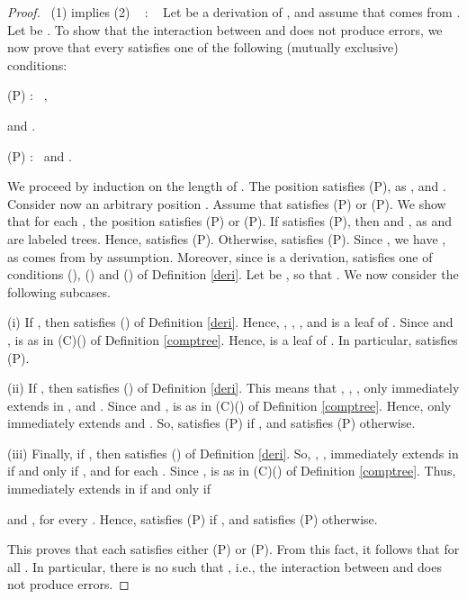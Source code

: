 \documentclass[copyright,creativecommons]{eptcs}
\def\ie{i.e., }
\theoremstyle{definition}
\newcommand{\squishlist}{
 \begin{list}{}
  { \setlength{\itemsep}{0pt}
     \setlength{\parsep}{3pt}
     \setlength{\topsep}{3pt}
     \setlength{\partopsep}{0pt}
     \setlength{\leftmargin}{1em}
     \setlength{\labelwidth}{1.5em}
     \setlength{\labelsep}{0.5em} } }
\newcommand{\squishend}{
  \end{list}  }
\begin{document}
 \begin{proof} \ (1) implies (2) \ \!\! :   \ \!\!
 Let   be a derivation of , and assume that  comes from . Let  be .  To show that the interaction between \/\@ and  \/\@
 does not produce errors,
 we   now prove that
 every
 satisfies
one of the following (mutually exclusive) conditions:
\squishlist
\item[ (P)] : \ ,

and .
\item[ (P)] : \    and
.
\squishend
 We proceed  by induction on the length of .
The position  satisfies (P),
as ,   and .
Consider now an  arbitrary position .
Assume that  satisfies (P) or (P).
We  show that for each , the position
 satisfies (P) or (P).
If  satisfies (P), then
 and
, as  and 
 are labeled trees. Hence,
  satisfies (P).
Otherwise,   satisfies   (P). Since
 , we have  , as  comes from  by assumption.
 Moreover,
since  is a derivation,   satisfies
one of
 conditions  (), () and () of Definition
\ref{deri}. Let
 be  ,
so that .
 We now consider   the following subcases.




(i) If  ,
then  satisfies
 () of Definition
\ref{deri}.
 Hence, , ,
 ,
  and
   is a leaf of . Since   and
 ,   
is as in (C)()
 of Definition \ref{comptree}.  Hence,
 is  a  leaf of
  . In particular,
 satisfies (P).



(ii) If , then  
satisfies   () of Definition
\ref{deri}. This means that ,
 , ,
 only  immediately extends  in ,
 and .
Since    and ,     
is as in (C)()
 of Definition \ref{comptree}. Hence, only  immediately extends 
 and . So,  satisfies (P) if , and   satisfies (P) otherwise.



 (iii) Finally, if  ,
then  satisfies
 () of Definition
\ref{deri}. So,
 ,
 ,
 immediately extends  in  if and only if ,
 and 
  for each .
Since   ,  
is as in   (C)()
 of Definition \ref{comptree}.  Thus,
 immediately extends  in   if and only if

 and , for every .
Hence,  satisfies (P) if , and   satisfies (P) otherwise.



This proves that  each  satisfies
either  (P) or (P).
From  this fact, it follows that
 for all .
In particular, there  is no 
such that , \ie the interaction between \/\@ and  \/\@
 does not produce errors.

\vspace{0.05cm}


\end{proof}
\end{document}
